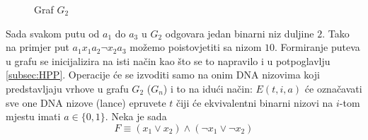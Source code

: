 \documentclass[12pt, a4paper]{book}
\begin{document}
\begin{spacing}{1.5}
\begin{exa}
\begin{figure}[!h]
\begin{center}
\end{center}
\caption{Graf $G_2$}
\label{fig:g2}
\end{figure}
Sada svakom putu od $a_1$ do $a_3$ u $G_2$ odgovara jedan binarni niz duljine $2$. Tako na primjer put $a_1x_1a_2\neg x_2a_3$ možemo poistovjetiti sa nizom $10$. Formiranje puteva u grafu se inicijalizira na isti način kao što se to napravilo i u potpoglavlju \ref{subsec:HPP}. Operacije će se izvoditi samo na onim DNA nizovima koji predstavljaju vrhove u grafu $G_2$ ($G_n$) i to na idući način: $E(t,i,a)$ će označavati sve one DNA nizove (lance) epruvete $t$ čiji će ekvivalentni binarni nizovi na $i$-tom mjestu imati $a\in \{0,1\}$. Neka je sada
\begin{equation}
\label{eq:prim}
F \equiv (x_1 \vee x_2)  \wedge (\neg x_1 \vee \neg x_2)
\end{equation}


\end{exa}
\end{spacing}
\end{document}
